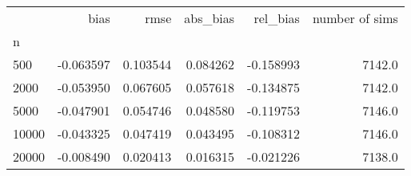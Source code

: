 \begin{tabular}{lrrrrr}
\toprule
{} &      bias &      rmse &  abs_bias &  rel_bias &  number of sims \\
n     &           &           &           &           &                 \\
\midrule
500   & -0.063597 &  0.103544 &  0.084262 & -0.158993 &          7142.0 \\
2000  & -0.053950 &  0.067605 &  0.057618 & -0.134875 &          7142.0 \\
5000  & -0.047901 &  0.054746 &  0.048580 & -0.119753 &          7146.0 \\
10000 & -0.043325 &  0.047419 &  0.043495 & -0.108312 &          7146.0 \\
20000 & -0.008490 &  0.020413 &  0.016315 & -0.021226 &          7138.0 \\
\bottomrule
\end{tabular}
